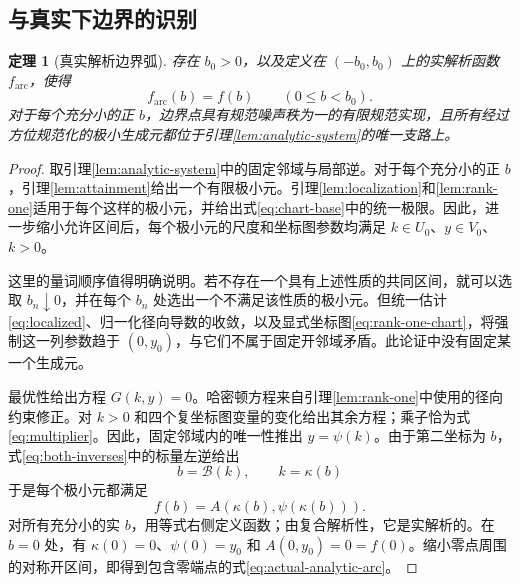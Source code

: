 \documentclass[UTF8,11pt,a4paper,fontset=fandol]{ctexart}
\newtheorem{theorem}{定理}[section]
\theoremstyle{definition}
\theoremstyle{remark}
\begin{document}
\subsection{与真实下边界的识别}
\begin{theorem}[真实解析边界弧]\label{thm:analytic-boundary}
存在 \(b_0>0\)，以及定义在 \((-b_0,b_0)\) 上的实解析函数 \(f_{\mathrm{arc}}\)，使得
\begin{equation}\label{eq:actual-analytic-arc}
 f_{\mathrm{arc}}(b)=f(b)\qquad(0\leq b<b_0).
\end{equation}
对于每个充分小的正 \(b\)，边界点具有规范噪声秩为一的有限规范实现，且所有经过方位规范化的极小生成元都位于引理\ref{lem:analytic-system}的唯一支路上。
\end{theorem}
\begin{proof}
取引理\ref{lem:analytic-system}中的固定邻域与局部逆。对于每个充分小的正 \(b\)，引理\ref{lem:attainment}给出一个有限极小元。引理\ref{lem:localization}和\ref{lem:rank-one}适用于每个这样的极小元，并给出式\eqref{eq:chart-base}中的统一极限。因此，进一步缩小允许区间后，每个极小元的尺度和坐标图参数均满足 \(k\in U_0\)、\(y\in V_0\)、\(k>0\)。

这里的量词顺序值得明确说明。若不存在一个具有上述性质的共同区间，就可以选取 \(b_n\downarrow0\)，并在每个 \(b_n\) 处选出一个不满足该性质的极小元。但统一估计\eqref{eq:localized}、归一化径向导数的收敛，以及显式坐标图\eqref{eq:rank-one-chart}，将强制这一列参数趋于 \((0,y_0)\)，与它们不属于固定开邻域矛盾。此论证中没有固定某一个生成元。

最优性给出方程 \(G(k,y)=0\)。哈密顿方程来自引理\ref{lem:rank-one}中使用的径向约束修正。对 \(k>0\) 和四个复坐标图变量的变化给出其余方程；乘子恰为式\eqref{eq:multiplier}。因此，固定邻域内的唯一性推出 \(y=\psi(k)\)。由于第二坐标为 \(b\)，式\eqref{eq:both-inverses}中的标量左逆给出
\[
 b=\mathcal B(k),\qquad k=\kappa(b)
\]
于是每个极小元都满足
\[
 f(b)=A(\kappa(b),\psi(\kappa(b))).
\]
对所有充分小的实 \(b\)，用等式右侧定义函数；由复合解析性，它是实解析的。在 \(b=0\) 处，有 \(\kappa(0)=0\)、\(\psi(0)=y_0\) 和 \(A(0,y_0)=0=f(0)\)。缩小零点周围的对称开区间，即得到包含零端点的式\eqref{eq:actual-analytic-arc}。
\end{proof}
\end{document}
